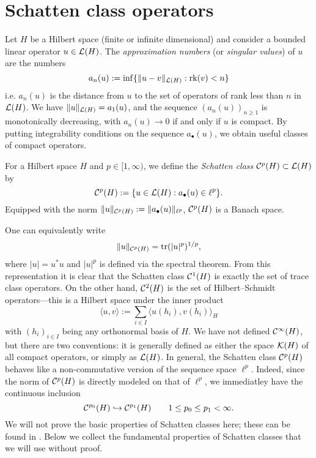

\section{Schatten class operators}
Let $H$ be a Hilbert space (finite or infinite dimensional) and consider a bounded linear operator $u \in \mathcal{L}(H)$.
The \emph{approximation numbers} (or \emph{singular values}) of $u$ are the numbers
\begin{equation*}
  a_{n}(u) := \inf\{\|u - v\|_{\mathcal{L}(H)} : \mathrm{rk}(v) < n\}
\end{equation*}
i.e. $a_{n}(u)$ is the distance from $u$ to the set of operators of rank less than $n$ in $\mathcal{L}(H)$.
We have $\|u\|_{\mathcal{L}(H)} = a_{1}(u)$, and the sequence $(a_{n}(u))_{n \geq 1}$ is monotonically decreasing, with $a_{n}(u) \to 0$ if and only if $u$ is compact.
By putting integrability conditions on the sequence $a_{\bullet}(u)$, we obtain useful classes of compact operators.

\begin{defn}
  For a Hilbert space $H$ and $p \in [1,\infty)$, we define the \emph{Schatten class} $\mathcal{C}^{p}(H) \subset \mathcal{L}(H)$ by
  \begin{equation*}
    \mathcal{C}^{p}(H) := \{u \in \mathcal{L}(H) : a_{\bullet}(u) \in \ell^{p}\}.
  \end{equation*}
  Equipped with the norm $\|u\|_{\mathcal{C}^{p}(H)} := \|a_{\bullet}(u)\|_{\ell^{p}}$, $\mathcal{C}^{p}(H)$ is a Banach space.
\end{defn}

One can equivalently write
\begin{equation*}
  \|u\|_{\mathcal{C}^{p}(H)} = \operatorname{tr}(|u|^{p})^{1/p},
\end{equation*}
where $|u| = u^{*}u$ and $|u|^{p}$ is defined via the spectral theorem.
From this representation it is clear that the Schatten class $\mathcal{C}^{1}(H)$ is exactly the set of trace class operators.
On the other hand, $\mathcal{C}^{2}(H)$ is the set of Hilbert--Schmidt operators---this is a Hilbert space under the inner product
\begin{equation*}
  \langle u, v \rangle := \sum_{i \in I} \langle u(h_{i}), v(h_{i}) \rangle_{H}
\end{equation*}
with $(h_{i})_{i \in I}$ being any orthonormal basis of $H$.
We have not defined $\mathcal{C}^\infty(H)$, but there are two conventions: it is generally defined as either the space $\mathcal{K}(H)$ of all compact operators, or simply as $\mathcal{L}(H)$.
In general, the Schatten class $\mathcal{C}^{p}(H)$ behaves like a non-commutative version of the sequence space $\ell^{p}$.
Indeed, since the norm of $\mathcal{C}^{p}(H)$ is directly modeled on that of $\ell^{p}$, we immediatley have the continuous inclusion
\begin{equation*}
  \mathcal{C}^{p_{0}}(H) \hookrightarrow \mathcal{C}^{p_{1}}(H) \qquad 1 \leq p_0 \leq p_1 < \infty.
\end{equation*}
We will not prove the basic properties of Schatten classes here; these can be found in \cite[Appendix D]{HNVW16}.
Below we collect the fundamental properties of Schatten classes that we will use without proof.

